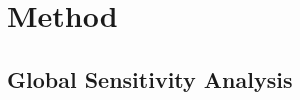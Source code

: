\section{Method}
\label{sec:method}
\subsection{Global Sensitivity Analysis}
\label{sub:sensitivity}